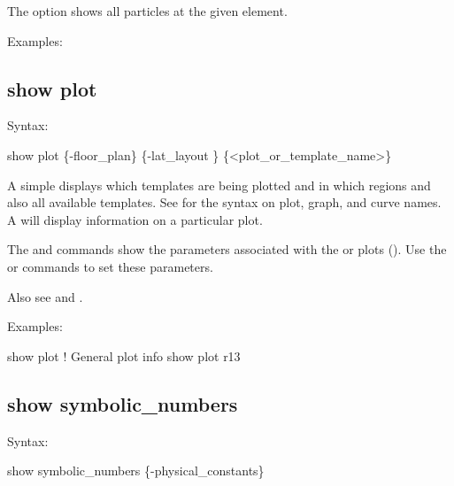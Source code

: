 {{{{{{The  option shows all particles at the given element.

Examples:


\subsection{show plot}
\label{s:show.plot}

Syntax:
\begin{example}
  show plot \{-floor_plan\} \{-lat_layout \} \{<plot_or_template_name>\}
\end{example}

A simple  displays which templates are being plotted and in which regions
and also all available templates. See  for the syntax on plot, graph, and
curve names. A  will display information on a
particular plot.

The  and  commands show the parameters
associated with the  or  plots ().
Use the  or  commands to set these parameters.

Also see  and .

Examples:
\begin{example}
  show plot      ! General plot info
  show plot r13
\end{example}


\subsection{show symbolic_numbers}
\label{s:show.symbolic}

Syntax:
\begin{example}
  show symbolic_numbers \{-physical_constants\}
\end{example}

}}}}}}
